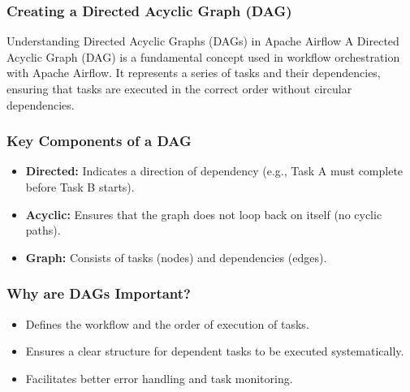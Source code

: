 \documentclass[aspectratio=169]{beamer}
\begin{document}
\begin{frame}[fragile]
    \frametitle{Creating a Directed Acyclic Graph (DAG)}
    \begin{block}{Understanding Directed Acyclic Graphs (DAGs) in Apache Airflow}
        A Directed Acyclic Graph (DAG) is a fundamental concept used in workflow orchestration with Apache Airflow. 
        It represents a series of tasks and their dependencies, ensuring that tasks are executed in the correct order without circular dependencies.
    \end{block}
\end{frame}

\begin{frame}[fragile]
    \frametitle{Key Components of a DAG}
    \begin{itemize}
        \item \textbf{Directed:} Indicates a direction of dependency (e.g., Task A must complete before Task B starts).
        \item \textbf{Acyclic:} Ensures that the graph does not loop back on itself (no cyclic paths).
        \item \textbf{Graph:} Consists of tasks (nodes) and dependencies (edges).
    \end{itemize}
\end{frame}

\begin{frame}[fragile]
    \frametitle{Why are DAGs Important?}
    \begin{itemize}
        \item Defines the workflow and the order of execution of tasks.
        \item Ensures a clear structure for dependent tasks to be executed systematically.
        \item Facilitates better error handling and task monitoring.
    \end{itemize}
\end{frame}
\end{document}
